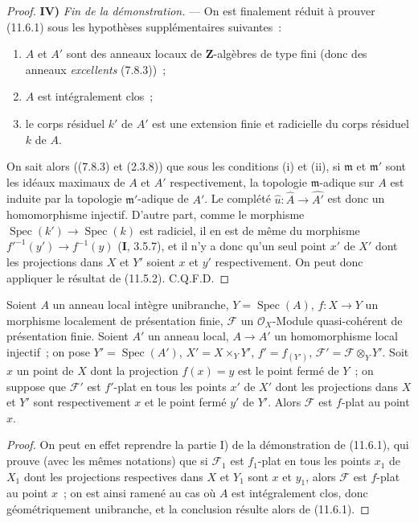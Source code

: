 \begin{proof}
\medskip
\noindent\textbf{IV)} \emph{Fin de la démonstration.} --- On est finalement
réduit à prouver (11.6.1) sous les hypothèses supplémentaires suivantes~:
\begin{enumerate}[label=(\roman*)]
  \item $A$ et $A'$ sont des anneaux locaux de $\mathbf Z$-algèbres de type fini
  (donc des anneaux \emph{excellents} (7.8.3))~;
  \item $A$ est intégralement clos~;
  \item le corps résiduel $k'$ de $A'$ est une extension finie et radicielle du
  corps résiduel $k$ de $A$.
\end{enumerate}
On sait alors ((7.8.3) et (2.3.8)) que sous les conditions (i) et (ii), si
$\mathfrak m$ et $\mathfrak m'$ sont les idéaux maximaux de $A$ et $A'$
respectivement, la topologie $\mathfrak m$-adique sur $A$ est induite par la
topologie $\mathfrak m'$-adique de $A'$. Le complété
$\widehat u:\widehat A\to\widehat{A'}$ est donc un homomorphisme injectif.
D'autre part, comme le morphisme
$\operatorname{Spec}(k')\to\operatorname{Spec}(k)$ est radiciel, il en est de
même du morphisme $f'^{-1}(y')\to f^{-1}(y)$ (\textbf I, 3.5.7), et il n'y a
donc qu'un seul point $x'$ de $X'$ dont les projections dans $X$ et $Y'$ soient
$x$ et $y'$ respectivement. On peut donc appliquer le résultat de (11.5.2).
C.Q.F.D.
\end{proof}

\begin{corollary}[11.6.2]
\label{IV.11.6.2-fr}
Soient $A$ un anneau local intègre unibranche, $Y=\operatorname{Spec}(A)$,
$f:X\to Y$ un morphisme localement de présentation finie, $\mathcal F$ un
$\mathcal O_X$-Module quasi-cohérent de présentation finie. Soient $A'$ un
anneau local, $A\to A'$ un homomorphisme local injectif~; on pose
$Y'=\operatorname{Spec}(A')$, $X'=X\times_Y Y'$, $f'=f_{(Y')}$,
$\mathcal F'=\mathcal F\otimes_Y Y'$. Soit $x$ un point de $X$ dont la
projection $f(x)=y$ est le point fermé de $Y$~; on suppose que $\mathcal F'$ est
$f'$-plat en tous les points $x'$ de $X'$ dont les projections dans $X$ et $Y'$
sont respectivement $x$ et le point fermé $y'$ de $Y'$. Alors $\mathcal F$ est
$f$-plat au point $x$.
\end{corollary}

\begin{proof}
On peut en effet reprendre la partie I) de la démonstration de (11.6.1), qui
prouve (avec les mêmes notations) que si $\mathcal F_1$ est $f_1$-plat en tous
les points $x_1$ de $X_1$ dont les projections respectives dans $X$ et $Y_1$
sont $x$ et $y_1$, alors $\mathcal F$ est $f$-plat au point $x$~; on est ainsi
ramené au cas où $A$ est intégralement clos, donc géométriquement unibranche, et
la conclusion résulte alors de (11.6.1).
\end{proof}

